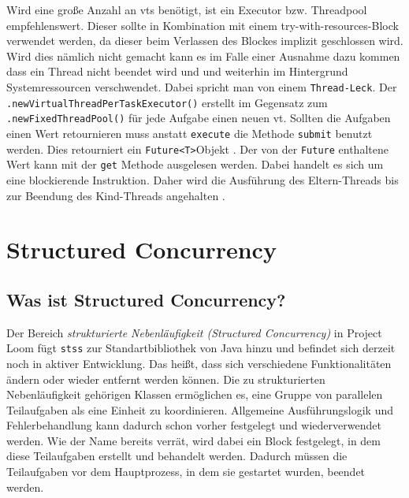     Wird eine große Anzahl an \Glspl{vt} benötigt,  ist ein Executor bzw. Threadpool empfehlenswert. Dieser sollte in Kombination mit einem
    try-with-resources-Block verwendet werden, da dieser beim Verlassen des Blockes implizit geschlossen wird. Wird dies nämlich nicht gemacht kann es
    im Falle einer Ausnahme dazu kommen dass ein Thread nicht beendet wird und und weiterhin im Hintergrund Systemressourcen verschwendet.
    Dabei spricht man von einem \texttt{Thread-Leck}. Der \texttt{.newVirtualThreadPerTaskExecutor()}
    erstellt im Gegensatz zum \texttt{.newFixedThreadPool()} für jede Aufgabe einen neuen \gls{vt}.
    Sollten die Aufgaben einen Wert retournieren muss anstatt \texttt{execute} die Methode \texttt{submit} benutzt werden. Dies retourniert ein \texttt{Future<T>}Objekt 
    \cite{oracle21VritualThreads}.
    Der von der \texttt{Future} enthaltene Wert kann mit der
    \texttt{get}  Methode ausgelesen werden. Dabei handelt es sich um eine blockierende Instruktion. Daher wird die Ausführung des Eltern-Threads bis zur
    Beendung des Kind-Threads angehalten \cite{oracle21Future}.
    


\section{Structured Concurrency}                                 %
\label{sec:Structured Concurrency}


\subsection{Was ist Structured Concurrency?}
\label{subsec:WasistSC?}
    Der Bereich \emph{strukturierte Nebenläufigkeit (Structured Concurrency)} in Project Loom fügt \texttt{\Glspl{sts}} zur Standartbibliothek von Java hinzu
    und befindet sich derzeit noch in
    aktiver Entwicklung. Das heißt, dass sich verschiedene Funktionalitäten ändern oder wieder entfernt werden können.
    Die zu strukturierten Nebenläufigkeit gehörigen Klassen ermöglichen
    es, eine Gruppe von parallelen Teilaufgaben als eine Einheit zu koordinieren. Allgemeine Ausführungslogik und Fehlerbehandlung kann dadurch schon vorher festgelegt und 
    wiederverwendet werden.
    Wie der Name bereits verrät, wird dabei ein Block festgelegt, in dem diese Teilaufgaben erstellt und behandelt werden.
    Dadurch müssen die Teilaufgaben vor dem Hauptprozess, in dem sie gestartet wurden, beendet werden.
    \cite{oracle21SC}

